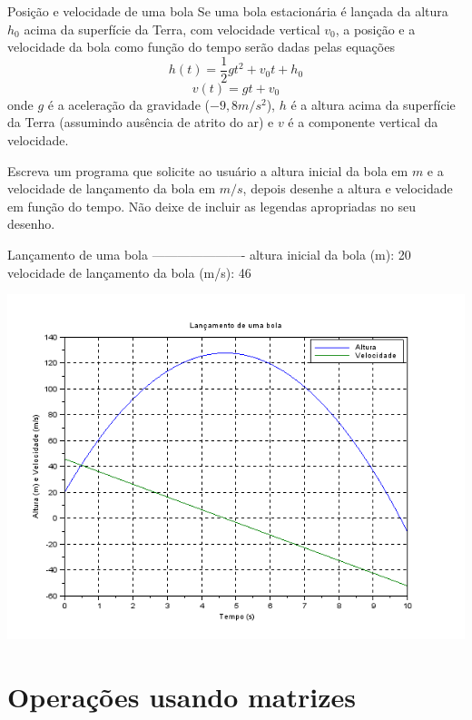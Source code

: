 \documentclass[11pt,fleqn]{practice}
\begin{document}
\begin{task}[breakable]{Posição e velocidade de uma bola }{}
  Se uma bola estacionária é lançada da altura $h_0$ acima da superfície
  da Terra, com velocidade vertical $v_0$, a posição e a velocidade da
  bola como função do tempo serão dadas pelas equações
  \[ h(t) = \frac{1}{2}gt^2 + v_0t + h_0 \]
  \[ v(t) = gt + v_0 \] onde $g$ é a aceleração da gravidade
  ($-9,8m/s^2$), $h$ é a altura acima da superfície da Terra (assumindo
  ausência de atrito do ar) e $v$ é a componente vertical da velocidade.

  Escreva um programa que solicite ao usuário a altura inicial da bola
  em $m$ e a velocidade de lançamento da bola em $m/s$, depois desenhe a
  altura e velocidade em função do tempo. Não deixe de incluir as
  legendas apropriadas no seu desenho.

  \begin{runexample}
Lançamento de uma bola
----------------------
altura inicial da bola (m): 20
velocidade de lançamento da bola (m/s): 46
  \end{runexample}
  \begin{center}
    \includegraphics[width=.8\linewidth]{images/bola}
  \end{center}

  \tcblower
  \solution
\end{task}

\pagebreak

\section{Operações usando matrizes}
\end{document}
